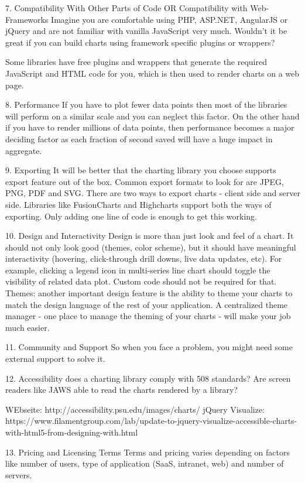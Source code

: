 7. Compatibility With Other Parts of Code OR Compatibility with Web-Frameworks
Imagine you are comfortable using PHP, ASP.NET, AngularJS or jQuery and are not familiar with vanilla JavaScript very much. Wouldn’t it be great if you can build charts using framework specific plugins or wrappers?

Some libraries have free plugins and wrappers that generate the required JavaScript and HTML code for you, which is then used to render charts on a web page.

8. Performance
If you have to plot fewer data points then most of the libraries will perform on a similar scale and you can neglect this factor. On the other hand if you have to render millions of data points, then performance becomes a major deciding factor as each fraction of second saved will have a huge impact in aggregate.

9. Exporting
It will be better that the charting library you choose supports export feature out of the box. Common export formats to look for are JPEG, PNG, PDF and SVG. There are two ways to export charts - client side and server side. Libraries like FusionCharts and Highcharts support both the ways of exporting. Only adding one line of code is enough to get this working.

10. Design and Interactivity
Design is more than just look and feel of a chart. It should not only look good (themes, color scheme), but it should have meaningful interactivity (hovering, click-through drill downs, live data updates, etc). For example, clicking a legend icon in multi-series line chart should toggle the visibility of related data plot. Custom code should not be required for that. Themes: another important design feature is the ability to theme your charts to match the design language of the rest of your application. A centralized theme manager - one place to manage the theming of your charts - will make your job much easier.


11. Community and Support
So when you face a problem, you might need some external support to solve it.

12. Accessibility
 does a charting library comply with 508 standards? Are screen readers like JAWS able to read the charts rendered by a library?

 WEbseite: http://accessibility.psu.edu/images/charts/
 jQuery Visualize: https://www.filamentgroup.com/lab/update-to-jquery-visualize-accessible-charts-with-html5-from-designing-with.html

13. Pricing and Licensing Terms
 Terms and pricing varies depending on factors like number of users, type of application (SaaS, intranet, web) and number of servers.

